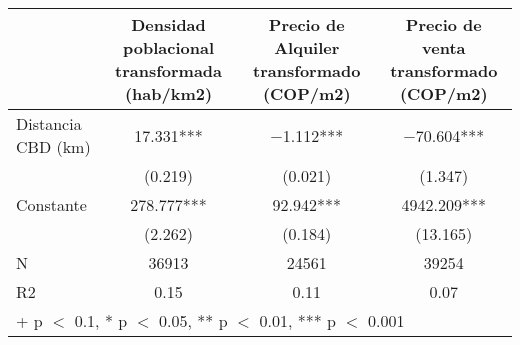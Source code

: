 \begin{table}
\centering
\begin{tabular}[t]{lccc}
\toprule
  & Densidad poblacional transformada (hab/km2) & Precio de Alquiler transformado (COP/m2) & Precio de venta transformado (COP/m2)\\
\midrule
Distancia CBD (km) & \num{17.331}*** & \num{-1.112}*** & \num{-70.604}***\\
 & (\num{0.219}) & (\num{0.021}) & (\num{1.347})\\
Constante & \num{278.777}*** & \num{92.942}*** & \num{4942.209}***\\
 & (\num{2.262}) & (\num{0.184}) & (\num{13.165})\\
\midrule
N & \num{36913} & \num{24561} & \num{39254}\\
R2 & \num{0.15} & \num{0.11} & \num{0.07}\\
\bottomrule
\multicolumn{4}{l}{\rule{0pt}{1em}+ p $<$ 0.1, * p $<$ 0.05, ** p $<$ 0.01, *** p $<$ 0.001}\\
\end{tabular}
\end{table}
